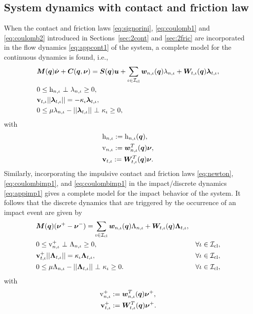 \documentclass[../DC2017114Bouma.tex]{subfiles}
\begin{document}
\subsection{System dynamics with contact and friction law}\label{sec:2contfric}
When the contact and friction laws \eqref{eq:signorini}, \eqref{eq:coulomb1} and \eqref{eq:coulomb2} introduced in Sections~\ref{sec:2cont} and \ref{sec:2fric} are incorporated in the flow dynamics \eqref{eq:appcont1} of the system, a complete model for the continuous dynamics is found, i.e.,
\begin{align}
&\Mb(\qb)\dot{\nub} + \Cb(\qb,\nub) = \Sb(\qb)\ub + \sum_{\iota\in\Ic_{\text{cl}}}\wb_{n,\iota}(\qb)\lambda_{n,\iota} + \Wb_{t,\iota}(\qb)\lambdab_{t,\iota}, \label{eq:ncpcontact1}\\
&0\leq \hrm_{n,\iota}\ \bot\ \lambda_{n,\iota} \geq 0,\label{eq:ncpcontact2}\\
&\vbf_{t,\iota}||\lambdab_{t,\iota}|| = -\kappa_{\iota}\lambdab_{t,\iota},\label{eq:ncpcontact3}\\
&0\leq \mu\lambda_{n,\iota} - ||\lambdab_{t,\iota}||\ \bot\ \kappa_{\iota} \geq 0,\label{eq:ncpcontact4}
\end{align}
with 
\begin{align}
&\mathrm{h}_{n,\iota} := \mathrm{h}_{n,\iota}({\boldsymbol{q}}),\label{eq:h}\\
&\mathrm{v}_{n,\iota} := {\boldsymbol{w}}^T_{n,\iota}({\boldsymbol{q}}) \boldsymbol{\nu},  \label{eq:zetan}\\
&\mathbf{v}_{t,\iota} := {\boldsymbol{W}}^T_{t,\iota}({\boldsymbol{q}}) \boldsymbol{\nu}. \label{eq:zetab}
\end{align}
Similarly, incorporating the impulsive contact and friction laws \eqref{eq:newton}, \eqref{eq:coulombimp1}, and \eqref{eq:coulombimp1} in the impact/discrete dynamics \eqref{eq:appimp1} gives a complete model for the impact behavior of the system. It follows that the discrete dynamics that are triggered by the occurrence of an impact event are given by
\begin{align}
&\Mb(\qb)(\nub^+ - \nub^-) = \sum_{\iota\in\Ic_{\text{cl}}} \wb_{n,\iota}(\qb)\Lambda_{n,\iota} + \Wb_{t,\iota}(\qb)\Lambdab_{t,\iota}, \label{eq:ncpimpact1}\\
&0\leq \vrm_{n,\iota}^+\ \bot\ \Lambda_{n,\iota} \geq 0, &\forall \iota\in\Ic_{\text{cl}},\label{eq:ncpimpact2}\\
&\vbf_{t,\iota}^+||\Lambdab_{t,\iota}|| = \kappa_{\iota}\Lambdab_{t,\iota},  &\forall \iota\in\Ic_{\text{cl}},\label{eq:ncpimpact3}\\
&0 \leq \mu\Lambda_{n,\iota} - ||\Lambdab_{t,\iota}||\ \bot\ \kappa_{\iota} \geq 0. &\forall \iota\in\Ic_{\text{cl}},\label{eq:ncpimpact4}
\end{align}
with 
\begin{align}
\mathrm{v}^+_{n,\iota} &:= {\boldsymbol{w}}^T_{n,\iota}({\boldsymbol{q}}) \boldsymbol{\nu}^+,\\
\mathbf{v}^+_{t,\iota} &:= {\boldsymbol{W}}^T_{t,\iota}({\boldsymbol{q}}) \boldsymbol{\nu}^+.\label{eq:ncpimpactend}
\end{align}
\end{document}
